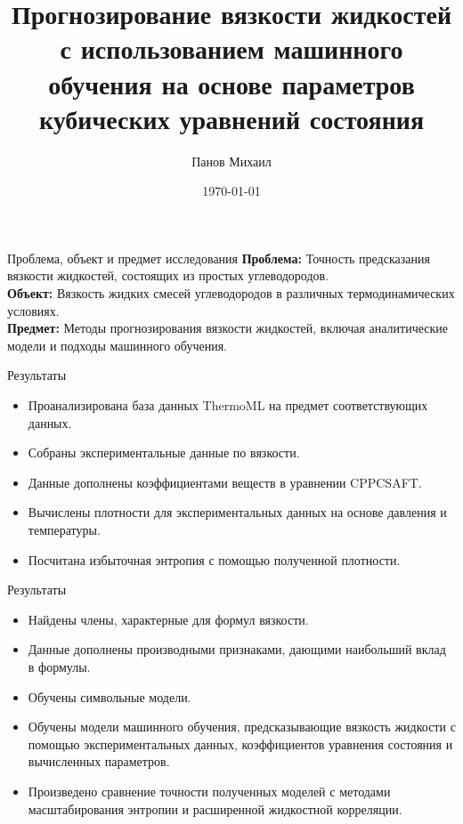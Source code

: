 \documentclass[aspectratio=169]{beamer}
\title{Прогнозирование вязкости жидкостей с использованием машинного обучения на основе параметров кубических уравнений состояния}
\author{Панов Михаил}
\date{\today}
\begin{document}
\begin{frame}
    \titlepage
\end{frame}

\begin{frame}{Проблема, объект и предмет исследования}
    \textbf{Проблема:} Точность предсказания вязкости жидкостей, состоящих из простых углеводородов.\\
    \textbf{Объект:} Вязкость жидких смесей углеводородов в различных термодинамических условиях.\\
    \textbf{Предмет:} Методы прогнозирования вязкости жидкостей, включая аналитические модели и подходы машинного обучения.
\end{frame}

\begin{frame}{Результаты}
    \begin{itemize}
        \item Проанализирована база данных ThermoML на предмет соответствующих данных.
        \item Собраны экспериментальные данные по вязкости.
        \item Данные дополнены коэффициентами веществ в уравнении CPPCSAFT.
        \item Вычислены плотности для экспериментальных данных на основе давления и температуры.
        \item Посчитана избыточная энтропия с помощью полученной плотности.
    \end{itemize}
\end{frame}

\begin{frame}{Результаты}
    \begin{itemize}
        \item Найдены члены, характерные для формул вязкости.
        \item Данные дополнены производными признаками, дающими наибольший вклад в формулы.
        \item Обучены символьные модели.
        \item Обучены модели машинного обучения, предсказывающие вязкость жидкости с помощью экспериментальных данных, коэффициентов уравнения состояния и вычисленных параметров.
        \item Произведено сравнение точности полученных моделей с методами масштабирования энтропии и расширенной жидкостной корреляции.
    \end{itemize}
\end{frame}
\end{document}

